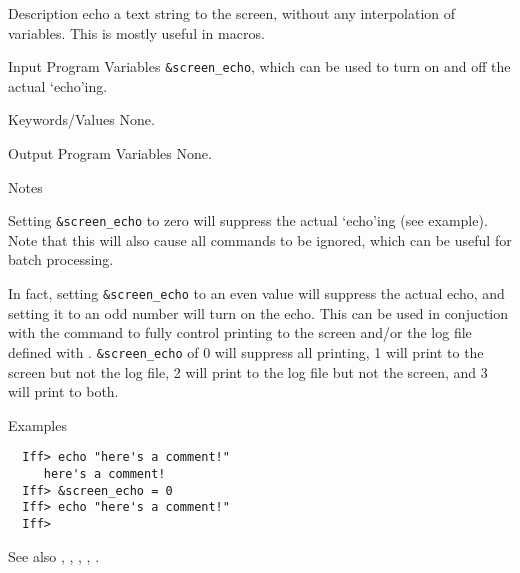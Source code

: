 \begin{IFFcom}
\item[Description] echo a text string to the screen, without any
  interpolation of variables. This is mostly useful in macros.
\item[Input Program Variables] {\tt{\&screen\_echo}}, which can be 
  used to turn on and off the actual `echo'ing.
\item[Keywords/Values]  None.
\item[Output Program Variables]  None.
\item[Notes]
  
  Setting {\tt{\&screen\_echo}} to zero will suppress the actual `echo'ing
  (see example).  Note that this will also cause all {} commands
  to be ignored, which can be useful for batch processing.
  
  In fact, setting {\tt{\&screen\_echo}} to an even value will suppress the
  actual echo, and setting it to an odd number will turn on the echo.  This
  can be used in conjuction with the {} command to fully control
  printing to the screen and/or the log file defined with {}.
  {\tt{\&screen\_echo}} of 0 will suppress all printing, 1 will print to
  the screen but not the log file, 2 will print to the log file but not the
  screen, and 3 will print to both.

\item[Examples] {\hspace{1.in} \vspace{-0.1truein} \relax }
\begin{verbatim} 
  Iff> echo "here's a comment!"
     here's a comment!
  Iff> &screen_echo = 0
  Iff> echo "here's a comment!"
  Iff>
\end{verbatim} 
  
\item[See also] {}, {}, {},
  {}, {}.
\end{IFFcom}


